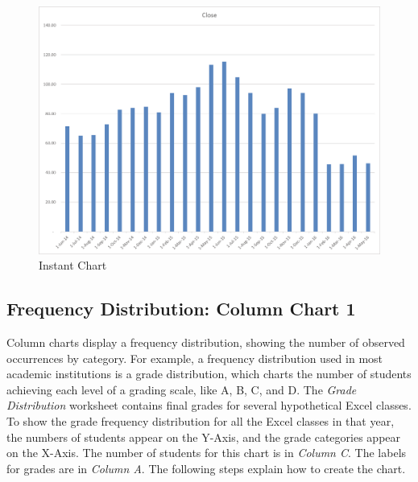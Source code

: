 \begin{figure}[H]
	\centering
	\includegraphics[width=\maxwidth{.95\linewidth}]{gfx/ch04_fig12}
	\caption{Instant Chart}
	\label{04:fig12}
\end{figure}

\subsection{Frequency Distribution: Column Chart 1}

Column charts display a frequency distribution, showing the number of observed occurrences by category. For example, a frequency distribution used in most academic institutions is a grade distribution, which charts the number of students achieving each level of a  grading scale, like A, B, C, and D. The \textit{Grade Distribution} worksheet contains final grades for several hypothetical Excel classes. To show the grade frequency distribution for all the Excel classes in that year, the numbers of students appear on the Y-Axis, and the grade categories appear on the X-Axis. The number of students for this chart is in \textit{Column C}. The labels for grades are in \textit{Column A}. The following steps explain how to create the chart.

